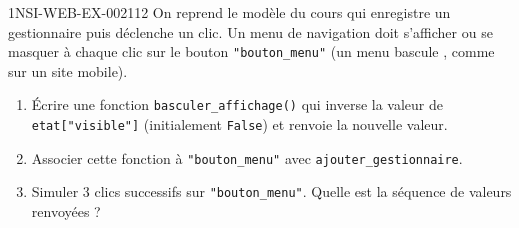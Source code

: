 \begin{exercice}{1NSI-WEB-EX-002}{1}{12}
On reprend le modèle du cours qui enregistre un gestionnaire puis déclenche un clic.
Un menu de navigation doit s'afficher ou se masquer à chaque clic sur le bouton
\lstinline{"bouton_menu"} (un menu \og bascule \fg{}, comme sur un site mobile).
\begin{enumerate}
  \item Écrire une fonction \lstinline{basculer_affichage()} qui inverse la valeur de \lstinline{etat["visible"]} (initialement \lstinline{False}) et renvoie la nouvelle valeur.
  \item Associer cette fonction à \lstinline{"bouton_menu"} avec \lstinline{ajouter_gestionnaire}.
  \item Simuler $3$ clics successifs sur \lstinline{"bouton_menu"}. Quelle est la séquence de valeurs renvoyées ?
\end{enumerate}
\end{exercice}
